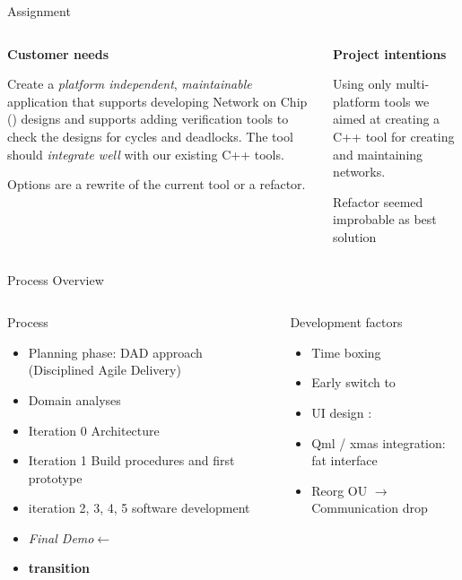 \documentclass[11pt]{beamer}
\begin{document}
\begin{frame}{Assignment}
	\begin{columns}
		\begin{column}[t]{5cm}
		{\bf Customer needs}

		Create a {\it platform independent}, {\it maintainable} application that supports
		developing Network on Chip (\Noc) designs and supports adding verification tools
		to check the \Noc designs for cycles and deadlocks. The tool should {\it integrate well}
		with our existing C++ tools.
		
		Options are a rewrite
		of the current tool or a refactor.
		\end{column}
		\begin{column}[t]{5cm}
		{\bf Project intentions}		
		
		Using only multi-platform tools we aimed at creating a C++ tool for creating
		and maintaining \Noc networks.
		
		Refactor seemed improbable as best solution
		\end{column}
	\end{columns}
\end{frame}

\begin{frame}{Process Overview}
	\begin{columns}
		\begin{column}[t]{5cm}
			Process
			\begin{itemize}
				\item <1->Planning phase: DAD approach (Disciplined Agile Delivery)
				\item <1->Domain analyses
				\item <1->Iteration 0 Architecture
				\item <1->Iteration 1 Build procedures and first prototype
				\item <1->iteration 2, 3, 4, 5 software development
				\item <1->\textit{Final Demo}$\leftarrow$
				\item <1->\textbf{transition}
			\end{itemize}
		\end{column}
		\begin{column}[t]{5cm}
			Development factors
			\begin{itemize}
				\item <2->Time boxing
				\item <2->Early switch to \qt
				\item <2->UI design : \qml
				\item <2->Qml / xmas integration: fat interface
				\item <2->Reorg OU $\rightarrow$ Communication drop
			\end{itemize}
		\end{column}
	\end{columns}
\end{frame}
\end{document}
